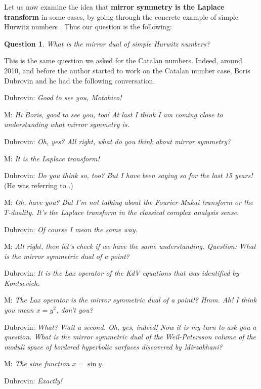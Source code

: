 \documentclass{amsart}
\newtheorem{quest}[thm]{Question}
\theoremstyle{definition}
\numberwithin{equation}{section}
\numberwithin{figure}{section}
\begin{document}
Let us now examine the idea
that \textbf{mirror symmetry is the Laplace transform}
in some cases,
by going through
the concrete example of simple Hurwitz numbers \cite{H}.  
Thus our  question is the following:

\begin{quest}
What is the mirror dual of 
simple Hurwitz numbers?
\end{quest}

\noindent
This is the same question we asked for the
Catalan numbers. Indeed, 
around 2010, and before the author started to 
work on the Catalan number case, Boris Dubrovin and he
 had the following
conversation.
\medskip

\noindent
Dubrovin: \textit{Good to see you, Motohico!} 

\noindent
M: \textit{Hi Boris, good to see you, too!
At last I think I am coming close to 
understanding what mirror symmetry is.}

\noindent
Dubrovin: \textit{Oh, yes? 
All right, what do you
think about mirror symmetry?}

\noindent
M: \textit{It is the Laplace transform!}

\noindent
Dubrovin: \textit{Do you think so, too? But I have
been saying so for the last 15 years!} (He was referring to \cite{D,DZ}.)

\noindent
M: \textit{Oh, have you? But I'm not talking about
the Fourier-Mukai transform or the $T$-duality. It's the 
Laplace transform in the classical complex analysis sense.}

\noindent
Dubrovin: \textit{Of course I mean the same way.}


\noindent
M: \textit{All right, then let's
check if we have the same understanding. 
Question: What is the mirror symmetric dual of a point?}

\noindent
Dubrovin: \textit{It is the Lax operator of 
the KdV equations that was 
identified by Kontsevich.}

\noindent
M: \textit{The Lax operator is the mirror symmetric dual of a point!? Hmm. Ah! I 
think you mean $x=y^2$, don't you?}

\noindent
Dubrovin: \textit{What? Wait a second. Oh, yes, indeed! Now it is my turn
to ask you a question. 
What is the mirror symmetric dual of 
the Weil-Petersson volume of the moduli space
of bordered hyperbolic surfaces discovered by
Mirzakhani?}


\noindent
M: \textit{The sine function
$x=\sin y$.}

\noindent
Dubrovin: \textit{Exactly!}
\end{document}
